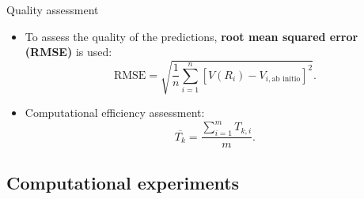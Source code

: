 \documentclass{beamer}
\def\D{\displaystyle}
\begin{document}
\begin{frame}{Quality assessment}
    \begin{itemize}
        \item To assess the quality of the predictions, \textbf{root mean squared error (RMSE)} is used:
        \begin{equation}
            \text{RMSE} = \sqrt{\frac{1}{n}\sum_{i=1}^n \left[V(R_i) - V_{i,\text{ab initio}}\right]^2}.
            \label{eq:rmse}
        \end{equation}
        \item Computational efficiency assessment:
        \begin{equation}
            \overline{T_k} = \D\frac{\D\sum_{i=1}^m T_{k,i}}{m}.
            \label{eq:efficiency}
        \end{equation}
    \end{itemize}
\end{frame}


\subsection{Computational experiments}
\end{document}
